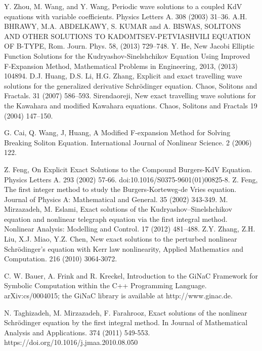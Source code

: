 \documentclass[prd,aps,floats,showkeys,nofootinbib,notitlepage]{revtex4}
\begin{document}
	\begin{thebibliography}{00}
		 Y. Zhou, M. Wang, and Y. Wang, Periodic wave solutions to a coupled KdV equations with variable coefficients. Physics Letters A. 308 (2003) 31–36.
		 A.H. BHRAWY, M.A. ABDELKAWY, S. KUMAR and A. BISWAS, SOLITONS AND OTHER SOLUTIONS TO KADOMTSEV-PETVIASHVILI EQUATION OF B-TYPE, Rom. Journ. Phys. 58, (2013) 729–748.
		  Y. He, New Jacobi Elliptic Function Solutions for the Kudryashov-Sinelshchikov Equation Using Improved F-Expansion Method, Mathematical Problems in Engineering, 2013, (2013) 104894.
		 D.J. Huang, D.S. Li, H.G. Zhang, Explicit and exact travelling wave solutions for the generalized derivative Schr\"odinger equation. Chaos, Solitons and Fractals. 31 (2007) 586–593.
		 Sirendaoreji, New exact travelling wave solutions for the Kawahara and modified Kawahara equations. Chaos, Solitons and Fractals 19 (2004) 147–150.
		
		 G. Cai, Q. Wang, J, Huang, A Modified F-expansion Method for Solving Breaking Soliton Equation. International Journal of Nonlinear Science. 2 (2006) 122.
				
		 Z. Feng, On Explicit Exact Solutions to the Compound Burgers-KdV Equation. Physics Letters A. 293 (2002) 57-66. doi:10.1016/S0375-9601(01)00825-8.
		 Z. Feng, The first integer method to study the Burgers-Korteweg-de Vries equation. Journal of Physics A: Mathematical and General. 35 (2002) 343-349.
		 M. Mirzazadeh, M. Eslami, Exact solutions of the Kudryashov–Sinelshchikov equation and nonlinear telegraph equation via the first integral method. Nonlinear Analysis: Modelling and Control. 17 (2012) 481–488.
		 Z.Y. Zhang, Z.H. Liu, X.J. Miao, Y.Z. Chen, New exact solutions to the perturbed nonlinear Schr\"odinger’s equation with Kerr law nonlinearity, Applied Mathematics and Computation. 216 (2010) 3064-3072.
			
		 C. W. Bauer, A. Frink and R. Kreckel, Introduction to the GiNaC Framework for Symbolic Computation within the C++ Programming Language. arXiv:cs/0004015; the GiNaC library is available at http://www.ginac.de.
		
		 N. Taghizadeh, M. Mirzazadeh, F. Farahrooz, Exact solutions of the nonlinear Schrödinger equation by the first integral method. In Journal of Mathematical Analysis and Applications. 374 (2011) 549-553. https://doi.org/10.1016/j.jmaa.2010.08.050
		

\end{thebibliography}
\end{document}
